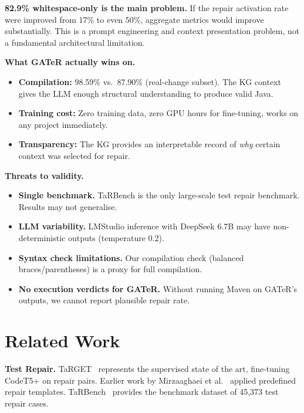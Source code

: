 \documentclass[conference,10pt]{IEEEtran}
\begin{document}
\textbf{82.9\% whitespace-only is the main problem.}  If the repair
activation rate were improved from 17\% to even 50\%, aggregate metrics
would improve substantially.  This is a prompt engineering and context
presentation problem, not a fundamental architectural limitation.

\textbf{What GATeR actually wins on.}
\begin{itemize}
  \item \textbf{Compilation:} 98.59\% vs.\ 87.90\% (real-change
        subset).  The KG context gives the LLM enough structural
        understanding to produce valid Java.
  \item \textbf{Training cost:} Zero training data, zero GPU hours
        for fine-tuning, works on any project immediately.
  \item \textbf{Transparency:} The KG provides an interpretable
        record of \emph{why} certain context was selected for repair.
\end{itemize}

\textbf{Threats to validity.}
\begin{itemize}
  \item \textbf{Single benchmark.} TaRBench is the only large-scale
        test repair benchmark.  Results may not generalise.
  \item \textbf{LLM variability.} LMStudio inference with DeepSeek
        6.7B may have non-deterministic outputs (temperature 0.2).
  \item \textbf{Syntax check limitations.} Our compilation check
        (balanced braces/parentheses) is a proxy for full compilation.
  \item \textbf{No execution verdicts for GATeR.} Without running
        Maven on GATeR's outputs, we cannot report plausible repair
        rate.
\end{itemize}

\section{Related Work}
\label{sec:related}

\textbf{Test Repair.}
TaRGET~\cite{target2024} represents the supervised state of the art,
fine-tuning CodeT5+ on repair pairs.  Earlier work by
Mirzaaghaei et al.~\cite{mirzaaghaei2012} applied predefined repair
templates.  TaRBench~\cite{tarbench2023} provides the benchmark
dataset of 45{,}373 test repair cases.
\end{document}
